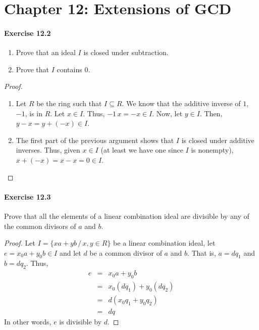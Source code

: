\section*{Chapter 12: Extensions of GCD}

\paragraph{Exercise 12.2}
\begin{enumerate}
    \item Prove that an ideal $I$ is closed under subtraction.
    \item Prove that $I$ contains $0$.
\end{enumerate}

\begin{proof}  
$ $\newline
\vspace{-0.1in}
\begin{enumerate}
    \item
    Let $R$ be the ring such that $I \subseteq R$. We know that
    the additive inverse of $1$, $-1$, is in $R$. Let $x \in I$. Thus,
    $-1 \, x = -x \in I$. Now, let $y \in I$. Then, $y - x = y + (-x)
    \in I$. 

    \item The first part of the previous argument shows that $I$ is closed
    under additive inverses. Thus, given $x \in I$ (at least we have one
    since $I$ is nonempty), $x + (-x) = x - x = 0 \in I$. 
\end{enumerate}
\end{proof}


\paragraph{Exercise 12.3}
Prove that all the elements of a linear combination ideal are divisible by
any of the common divisors of $a$ and $b$.

\begin{proof}  
Let $I = \{xa + yb \, / \, x,y \in R \}$ be a linear combination ideal, 
let $e = x_0 a + y_0 b \in I$ and let $d$ be a common divisor of $a$ and $b$.
That is, $a = d q_1$ and $b = d q_2$. Thus,
\begin{eqnarray*}
    e &=& x_0 a + y_0 b \\
      &=& x_0 (d q_1) + y_0 (d q_2) \\
      &=& d (x_0 q_1 + y_0 q_2) \\
      &=& d q
\end{eqnarray*}
In other words, $e$ is divisible by $d$.
\end{proof}


